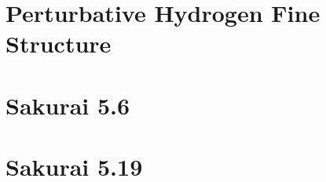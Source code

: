 \documentclass[
a4paper,
10pt,
twoside,
]{article}
\begin{document}
\titleinf
\maketitle
\startmcols

\section{Perturbative Hydrogen Fine Structure}\label{sec: I}


\section{Sakurai 5.6}\label{sec: II}

\section{Sakurai 5.19}\label{sec: III}

\stopmcols
\end{document}
